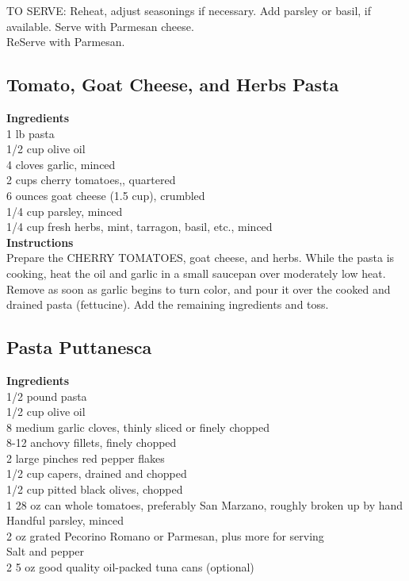 \documentclass{article}
\numberwithin{figure}{section}
\numberwithin{equation}{section}
\begin{document}
TO SERVE:  Reheat, adjust seasonings if necessary.  Add parsley or basil, if available.  Serve with Parmesan cheese.\\
ReServe with Parmesan.

\pagebreak
\subsection{Tomato, Goat Cheese, and Herbs Pasta}
{\bf Ingredients}\\
1 lb pasta\\
1/2 cup olive oil\\
4 cloves garlic, minced\\
2 cups cherry tomatoes,, quartered\\
6 ounces goat cheese (1.5 cup), crumbled\\
1/4 cup parsley, minced\\
1/4 cup fresh herbs, mint, tarragon, basil, etc., minced\\

{\bf Instructions}\\
Prepare the CHERRY TOMATOES, goat cheese, and herbs.  While the pasta is cooking,  heat the oil and garlic in a small saucepan over moderately low heat.    Remove as soon as garlic begins to turn color, and pour it over the cooked and drained pasta (fettucine).  Add the remaining ingredients and toss.

\pagebreak
\subsection{Pasta Puttanesca}
{\bf Ingredients}\\
1/2 pound pasta\\
1/2 cup olive oil\\
8 medium garlic cloves, thinly sliced or finely chopped\\
8-12 anchovy fillets, finely chopped\\
2 large pinches red pepper flakes\\
1/2 cup capers, drained and chopped\\
1/2 cup pitted black olives, chopped\\
1 28 oz can whole tomatoes, preferably San Marzano, roughly broken up by hand\\
Handful parsley, minced\\
2 oz grated Pecorino Romano or Parmesan, plus more for serving\\
Salt and pepper\\
2 5 oz good quality oil-packed tuna cans (optional)\\
\end{document}
